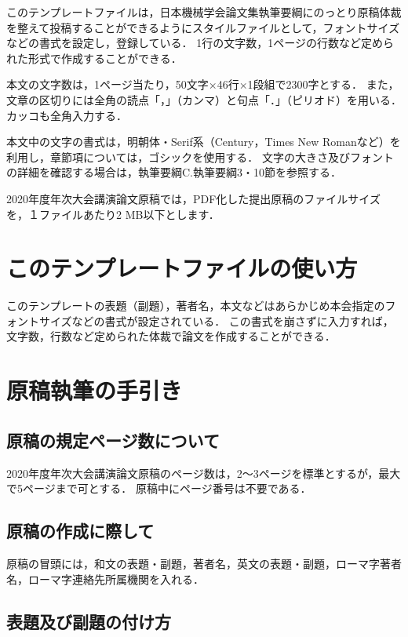 \documentclass[a4paper, 10pt, dvips, fleqn, uplatex]{jsarticle}
\begin{document}
このテンプレートファイルは，日本機械学会論文集執筆要綱にのっとり原稿体裁を整えて投稿することができるようにスタイルファイルとして，フォントサイズなどの書式を設定し，登録している．
1行の文字数，1ページの行数など定められた形式で作成することができる．

本文の文字数は，1ページ当たり，50文字×46行×1段組で2300字とする．
また，文章の区切りには全角の読点「，」（カンマ）と句点「．」（ピリオド）を用いる．カッコも全角入力する．

本文中の文字の書式は，明朝体・Serif系（Century，Times New Romanなど）を利用し，章節項については，ゴシックを使用する．
文字の大きさ及びフォントの詳細を確認する場合は，執筆要綱C.執筆要綱3・10節を参照する．

2020年度年次大会講演論文原稿では，PDF化した提出原稿のファイルサイズを，１ファイルあたり2 MB以下とします．


\section{このテンプレートファイルの使い方}

このテンプレートの表題（副題），著者名，本文などはあらかじめ本会指定のフォントサイズなどの書式が設定されている．
この書式を崩さずに入力すれば，文字数，行数など定められた体裁で論文を作成することができる．


\section{原稿執筆の手引き}

\subsection{原稿の規定ページ数について}

2020年度年次大会講演論文原稿のページ数は，2～3ページを標準とするが，最大で5ページまで可とする．
原稿中にページ番号は不要である．


\subsection{原稿の作成に際して}

原稿の冒頭には，和文の表題・副題，著者名，英文の表題・副題，ローマ字著者名，ローマ字連絡先所属機関を入れる．


\subsection{表題及び副題の付け方}
\end{document}

